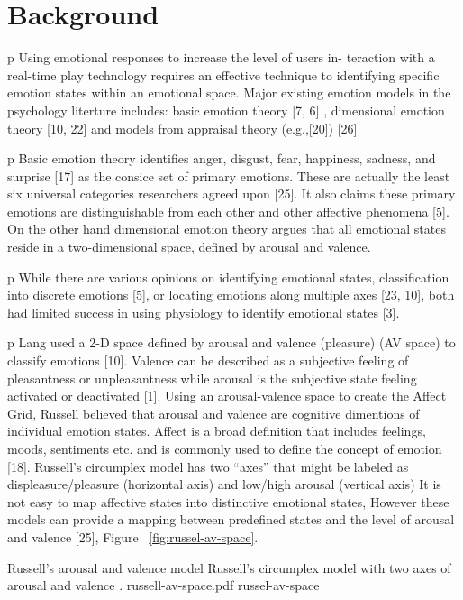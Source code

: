 \documentclass[conference]{include/IEEEtran}
\begin{document}

\section{Background}
\label{sec:lit-review}

p Using emotional responses to increase the level of users in- teraction with a real-time play technology requires an effective technique to identifying speciﬁc emotion states within an emotional space. Major existing emotion models in the psychology literture includes: basic emotion theory [7, 6] , dimensional emotion theory [10, 22] and models from appraisal theory (e.g.,[20]) [26]

p Basic emotion theory identiﬁes anger, disgust, fear, happiness, sadness, and surprise [17] as the consice set of primary emotions. These are actually the least six universal categories researchers agreed upon [25]. It also claims these primary emotions are distinguishable from each other and other affective phenomena [5]. On the other hand dimensional emotion theory argues that all emotional states reside in a two-dimensional space, deﬁned by arousal and valence.

p While there are various opinions on identifying emotional states, classiﬁcation into discrete emotions [5], or locating emotions along multiple axes [23, 10], both had limited success in using physiology to identify emotional states [3].

p Lang used a 2-D space deﬁned by arousal and valence (pleasure) (AV space) to classify emotions [10]. Valence can be described as a subjective feeling of pleasantness or unpleasantness while arousal is the subjective state feeling activated or deactivated [1]. Using an arousal-valence space to create the Affect Grid, Russell believed that arousal and valence are cognitive dimentions of individual emotion states. Affect is a broad deﬁnition that includes feelings, moods, sentiments etc. and is commonly used to deﬁne the concept of emotion [18]. Russell’s circumplex model has two “axes” that might be labeled as displeasure/pleasure (horizontal axis) and low/high arousal (vertical axis) It is not easy to map affective states into distinctive emotional states, However these models can provide a mapping between predeﬁned states and the level of arousal and valence [25], Figure ~\ref{fig:russel-av-space}.

\img
{Russell's arousal and valence model}
{Russell's circumplex model with two axes of arousal and valence \footnotemark.}
{russell-av-space.pdf}
{russel-av-space}
\end{document}
